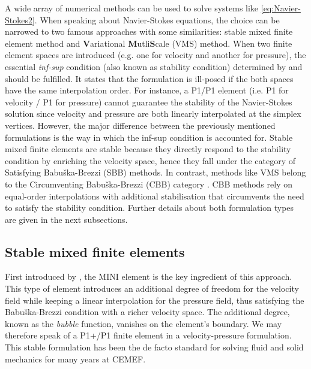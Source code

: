 A wide array of numerical methods can be used to solve systems like \cref{eq:Navier-Stokes2}. 
When speaking about Navier-Stokes equations, the choice can be narrowed to two famous
approaches with some similarities: stable mixed finite element method and \textbf{V}ariational \textbf{M}utli\textbf{S}cale (VMS) method.
When two finite element spaces are introduced (e.g. one for velocity and another for pressure), 
the essential \emph{inf-sup} condition (also known as stability condition) determined by \citet{babuska_error-bounds_1971} and \citet{brezzi_existence_1974} 
should be fulfilled. It states that the formulation is ill-posed if the both spaces have the same interpolation 
order. For instance, a P1/P1 element (i.e. P1 for velocity / P1 for pressure) cannot guarantee the stability of the Navier-Stokes solution since
velocity and pressure are both linearly interpolated at the simplex vertices.
However, the major difference between the previously mentioned formulations is the way in which the inf-sup condition is accounted for.
Stable mixed finite elements are stable because they directly respond to the stability condition by enriching the velocity space, 
hence they fall under the category of Satisfying Babuška-Brezzi (SBB) methods. In contrast, methods like VMS belong to the
Circumventing Babuška-Brezzi (CBB) category \citep{barbosa_finite_1991}.
CBB methods rely on equal-order interpolations with additional stabilisation that circumvents the need to satisfy the stability condition.
Further details about both formulation types are given in the next subsections.

\subsection{Stable mixed finite elements}

First introduced by \citet{arnold_stable_1984}, the MINI element is the key ingredient of this approach.
This type of element introduces an additional degree of freedom for the velocity field while keeping a linear
interpolation for the pressure field, thus satisfying the Babuška-Brezzi condition with a richer velocity space.
The additional degree, known as the \emph{bubble} function, vanishes on the element's boundary.
We may therefore speak of a P1+/P1 finite element in a velocity-pressure formulation. 
This stable formulation has been the de facto standard for solving fluid 
and solid mechanics for many years at CEMEF.

